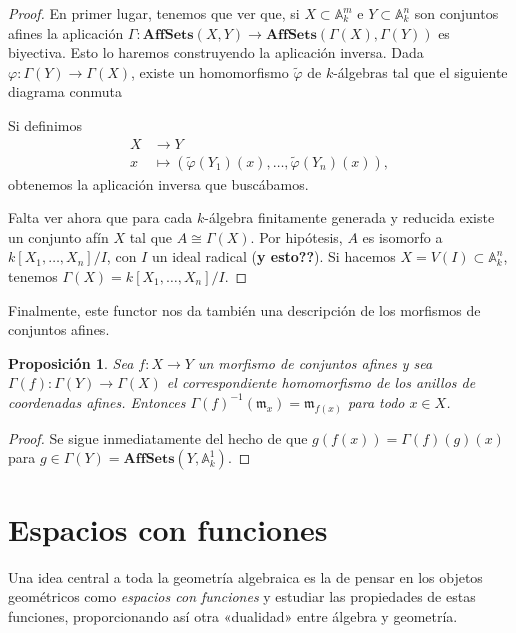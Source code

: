 \documentclass[12pt,a4paper]{article}
\newtheorem{prop}[thm]{Proposición}
\theoremstyle{definition} \newtheorem{defn}[thm]{Definición}
\theoremstyle{definition} \newtheorem{ejemplo}[thm]{Ejemplo}
\theoremstyle{definition} \newtheorem{ejercicio}[thm]{Ejercicio}
\theoremstyle{remark} \newtheorem*{obs}{Observación}
\def\AA{\mathbb{A}}
\def\mm{\mathfrak{m}}
\begin{document}
      \begin{proof}
	En primer lugar, tenemos que ver que, si $X\subset \AA^m_k$ e $Y\subset \AA^n_k$ son conjuntos afines la aplicación $\Gamma: \mathbf{AffSets}(X,Y) \rightarrow \mathbf{AffSets}(\Gamma(X),\Gamma(Y))$ es biyectiva. Esto lo haremos construyendo la aplicación inversa. Dada $\varphi:\Gamma(Y) \rightarrow \Gamma(X)$, existe un homomorfismo $\tilde \varphi$ de $k$-álgebras tal que el siguiente diagrama conmuta
	\begin{center}
	 \end{center}
	 Si definimos 
	 \begin{align*}
	   X&\longrightarrow Y\\ 
	     x &\longmapsto (\tilde\varphi(Y_1)(x),\dots,\tilde\varphi(Y_n)(x)),
	   \end{align*}
	   obtenemos la aplicación inversa que buscábamos.

	   Falta ver ahora que para cada $k$-álgebra finitamente generada y reducida existe un conjunto afín $X$ tal que $A\cong \Gamma(X)$. Por hipótesis, $A$ es isomorfo a $k[X_1,\dots,X_n]/I$, con $I$ un ideal radical (\textbf{y esto??}). Si hacemos $X=V(I)\subset \AA^n_k$, tenemos $\Gamma(X)=k[X_1,\dots,X_n]/I$.
      \end{proof}

      Finalmente, este functor nos da también una descripción de los morfismos de conjuntos afines.
      \begin{prop}
	Sea $f:X\rightarrow Y$ un morfismo de conjuntos afines y sea $\Gamma(f):\Gamma(Y)\rightarrow \Gamma(X)$ el correspondiente homomorfismo de los anillos de coordenadas afines. Entonces $\Gamma(f)^{-1}(\mm_x)=\mm_{f(x)}$ para todo $x\in X$.
      \end{prop}
      \begin{proof}
	Se sigue inmediatamente del hecho de que $g(f(x))=\Gamma(f)(g)(x)$ para $g\in \Gamma(Y)=\mathbf{AffSets}(Y,\AA^1_k)$.
      \end{proof}

      \section{Espacios con funciones}
      Una idea central a toda la geometría algebraica es la de pensar en los objetos geométricos como \emph{espacios con funciones} y estudiar las propiedades de estas funciones, proporcionando así otra «dualidad» entre álgebra y geometría. 
\end{document}
